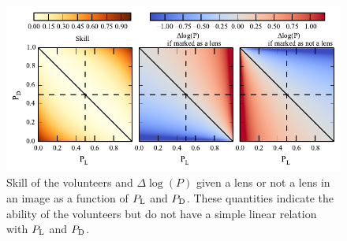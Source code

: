 \documentclass[useAMS,usenatbib,a4paper]{mn2e}
\begin{document}
\begin{figure}
\begin{center}
\includegraphics[scale=1.0]{dlnp_skill.pdf}
\caption{ \label{fig:skilldlnp}
Skill of the volunteers and $\Delta\log(P)$ given a lens or not a lens in
an image as a function of $P_{\rm L}$ and $P_{\rm D}$. These
quantities indicate the ability of the volunteers but do not have a simple
linear relation with $P_{\rm L}$ and $P_{\rm D}$.
}
\end{center}
\end{figure}







\label{lastpage}
\bsp
\end{document}
